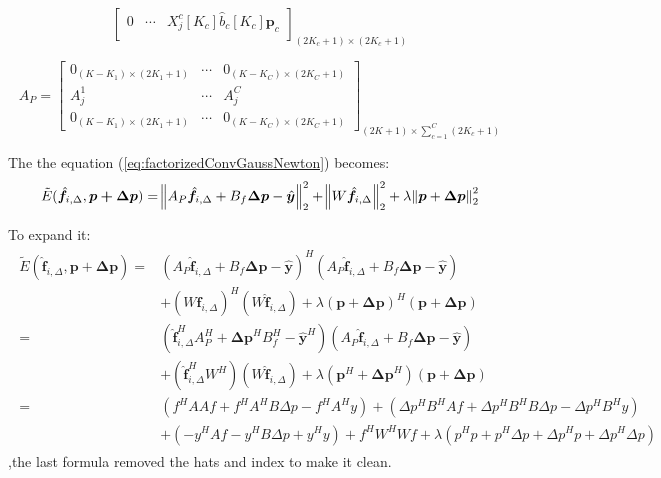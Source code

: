 \documentclass[12pt]{article}
\numberwithin{equation}{section}
\begin{document}
{\begin{equation}
\begin{bmatrix}
		0 & \cdots & X^c_j[K_c]\hat{b}_c[K_c]  \bm{p}_c\\
	\end{bmatrix}_{(2K_c+1)\times(2K_c+1)}
\end{equation} \par
\begin{equation}
	A_P = 
	\begin{bmatrix}
		0_{(K-K_1)\times(2K_1+1)} & \cdots & 0_{(K-K_C)\times(2K_C+1)}  \\
		A_j^1 & \cdots & A_j^C \\
		0_{(K-K_1)\times(2K_1+1)} & \cdots & 0_{(K-K_C)\times(2K_C+1)} 
	\end{bmatrix}_{(2K+1)\times \sum^C_{c=1}(2K_c+1)}
\end{equation} \par
The the equation (\ref{eq:factorizedConvGaussNewton}) becomes:
\begin{equation} \label{eq:targetDerivativeECO}
	\tilde{E}(\hat{\bm{f}}_{i, \Delta}, \bm{p + \Delta p})
		=\norm{A_P\hat{\bm{f}}_{i, \Delta}+ B_f \bm{\Delta p} -\hat{\bm{y}}}^2_2
		 + \norm{W \hat{\bm{f}}_{i, \Delta}}^2_2
		 + \lambda \norm{\bm{p} + \bm{\Delta p}}^2_2
\end{equation} \par
To expand it: 
\begin{align}\begin{split}
	\tilde{E}(\hat{\bm{f}}_{i, \Delta}, \bm{p + \Delta p}) 
		=&(A_P\hat{\bm{f}}_{i, \Delta}+ B_f \bm{\Delta p} -\hat{\bm{y}})^H(A_P\hat{\bm{f}}_{i, \Delta}+ B_f \bm{\Delta p} -\hat{\bm{y}}) \\
		& + (W \hat{\bm{f}}_{i, \Delta})^H(W \hat{\bm{f}}_{i, \Delta})
		 + \lambda (\bm{p} + \bm{\Delta p})^H(\bm{p} + \bm{\Delta p}) \\
		 =&(\hat{\bm{f}}_{i, \Delta}^HA_P^H+ \bm{\Delta p}^HB_f^H -\hat{\bm{y}}^H)(A_P\hat{\bm{f}}_{i, \Delta}+ B_f \bm{\Delta p} -\hat{\bm{y}}) \\
		& + (\hat{\bm{f}}_{i, \Delta}^HW^H)(W \hat{\bm{f}}_{i, \Delta})
		 + \lambda (\bm{p} ^H+ \bm{\Delta p}^H)(\bm{p} + \bm{\Delta p}) \\
		 =&(f^HAAf+f^HA^HB\Delta p - f^HA^Hy) + (\Delta p^HB^HAf + \Delta p^HB^HB\Delta p - \Delta p^HB^Hy) \\
		 &+(-y^HAf -y^HB\Delta p + y^Hy) + f^HW^HWf + \lambda (p^Hp+p^H\Delta p+\Delta p^H p + \Delta p^H\Delta p)
\end{split}\end{align} 
,the last formula removed the hats and index to make it clean. \par
}
\end{document}
